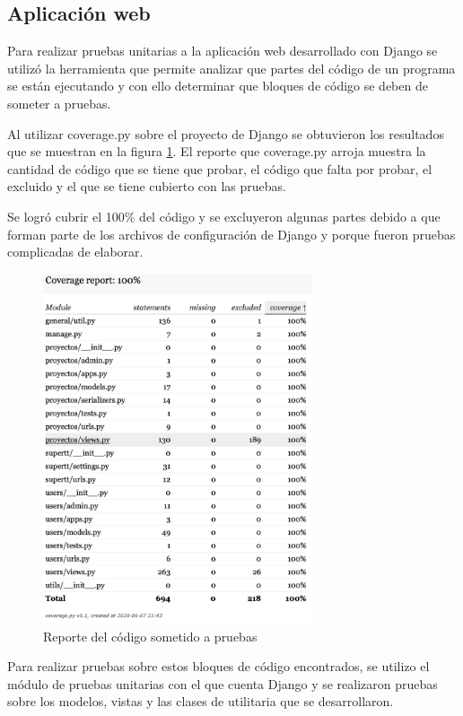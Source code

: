 \subsection{Aplicación web}

Para realizar pruebas unitarias a la aplicación web desarrollado con Django se utilizó la herramienta que permite analizar que partes del código de un programa se están ejecutando y con ello determinar que bloques de código se deben de someter a pruebas.

Al utilizar coverage.py sobre el proyecto de Django se obtuvieron los resultados que se muestran en la figura \ref{fig:coverage}. El reporte que coverage.py arroja muestra la cantidad de código que se tiene que probar, el código que falta por probar, el excluido y el que se tiene cubierto con las pruebas.

Se logró cubrir el 100\% del código y se excluyeron algunas partes debido a que forman parte de los archivos de configuración de Django y porque fueron pruebas complicadas de elaborar.

\begin{figure}[H]
	\centering
	\includegraphics[width=300px]{capitulo6/unitarias/img/coverage.png}
	\caption{Reporte del código sometido a pruebas}
	\label{fig:coverage}
\end{figure}

Para realizar pruebas sobre estos bloques de código encontrados, se utilizo el módulo de pruebas unitarias con el que cuenta Django y se realizaron pruebas sobre los modelos, vistas y las clases de utilitaria que se desarrollaron.

